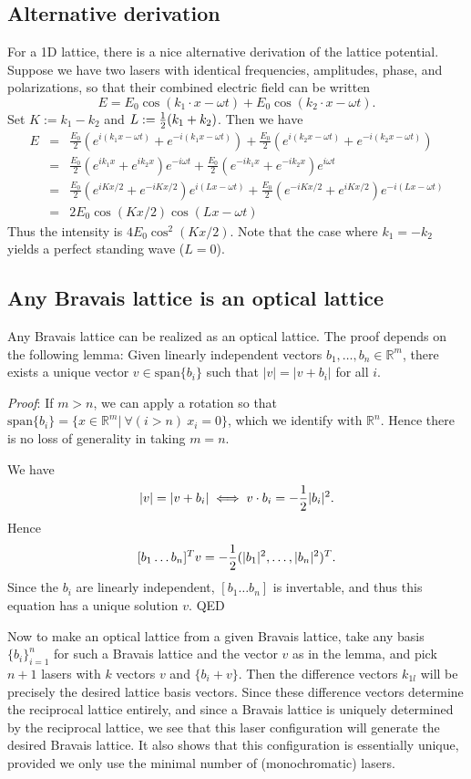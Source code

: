 \documentclass[aps,prb,floatfix,amsmath,amssymb,groupedaddress]{revtex4}
\begin{document}
\subsection{Alternative derivation}
For a 1D lattice, there is a nice alternative derivation of the lattice potential.  Suppose we have two lasers with identical frequencies, amplitudes, phase, and polarizations, so that their combined electric field can be written
$$ E = E_0 \cos(k_1 \cdot x - \omega t) + E_0 \cos(k_2 \cdot x - \omega t).$$
Set $K:=k_1-k_2$ and $L:={\frac{1}{2}}(k_1 + k_2)$.  Then we have
\begin{eqnarray}
E & = & \frac{E_0}{2} \left(e^{i(k_1x-\omega t)}+e^{-i(k_1x-\omega t)}\right) + \frac{E_0}{2} \left(e^{i(k_2x-\omega t)}+e^{-i(k_2x-\omega t)}\right)  \nonumber\\
& = & \frac{E_0}{2} \left(e^{ik_1x} + e^{ik_2x}\right) e^{-i\omega t} + \frac{E_0}{2} \left(e^{-ik_1x} + e^{-ik_2x}\right)e^{i\omega t}  \nonumber\\
& = & \frac{E_0}{2} \left(e^{iKx/2} + e^{-iKx/2}\right) e^{i(Lx-\omega t)} + \frac{E_0}{2} \left(e^{-iKx/2} + e^{iKx/2}\right)e^{-i(Lx-\omega t)}  \nonumber\\
& = & 2E_0\cos(Kx/2)\cos(Lx-\omega t) \nonumber
\label{lattice1d}
\end{eqnarray}
Thus the intensity is $4E_0 \cos^2(Kx/2)$.  Note that the case where $k_1=-k_2$ yields a perfect standing wave ($L=0$).  

\subsection{Any Bravais lattice is an optical lattice}
Any Bravais lattice can be realized as an optical lattice.  The proof depends on the following lemma: Given linearly independent vectors $b_1,\dots,b_n\in \mathbb{R}^m$, there exists a unique vector $v\in\text{span}\{b_i\}$ such that $|v| = |v+b_i|$ for all $i$.  

\textit{Proof}:  If $m>n$, we can apply a rotation so that $\text{span}\{b_i\} = \{x\in\mathbb{R}^m | \:\forall (i>n) \: x_i=0 \}$, which we identify with $\mathbb{R}^n$.  Hence there is no loss of generality in taking $m=n$.

We have $$|v| = |v+b_i| \iff v\cdot b_i = -{\frac{1}{2}} |b_i|^2.$$  Hence $$[b_1 \dots b_n]^Tv = -{\frac{1}{2}}(|b_1|^2,\dots,|b_n|^2)^T.$$  Since the $b_i$ are linearly independent, $[b_1\dots b_n]$ is invertable, and thus this equation has a unique solution $v$.  QED

Now to make an optical lattice from a given Bravais lattice, take any basis $\{b_i\}_{i=1}^n$ for such a Bravais lattice and the vector $v$ as in the lemma, and pick $n+1$ lasers with $k$ vectors $v$ and $\{b_i+v\}$.  Then the difference vectors $k_{1l}$ will be precisely the desired lattice basis vectors.  Since these difference vectors determine the reciprocal lattice entirely, and since a Bravais lattice is uniquely determined by the reciprocal lattice, we see that this laser configuration will generate the desired Bravais lattice.  It also shows that this configuration is essentially unique, provided we only use the minimal number of (monochromatic) lasers.  
\end{document}
